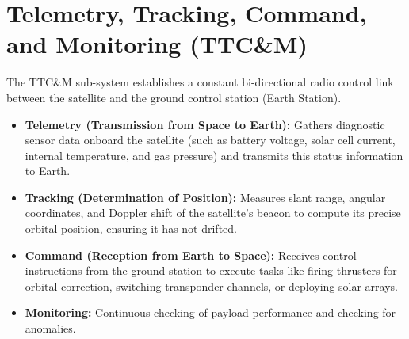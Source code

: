 \documentclass[12pt,a4paper]{article}
\begin{document}
\begin{tcolorbox}[tikzbox, title={Satellite Sub-systems Integration}]
\centering
{}
\end{tcolorbox}

\section{Telemetry, Tracking, Command, and Monitoring (TTC\&M)}

The TTC\&M sub-system establishes a constant bi-directional radio control link between the satellite and the ground control station (Earth Station).

\begin{itemize}[leftmargin=*, itemsep=3.5pt]
  \item \textbf{Telemetry (Transmission from Space to Earth):} Gathers diagnostic sensor data onboard the satellite (such as battery voltage, solar cell current, internal temperature, and gas pressure) and transmits this status information to Earth.
  \item \textbf{Tracking (Determination of Position):} Measures slant range, angular coordinates, and Doppler shift of the satellite's beacon to compute its precise orbital position, ensuring it has not drifted.
  \item \textbf{Command (Reception from Earth to Space):} Receives control instructions from the ground station to execute tasks like firing thrusters for orbital correction, switching transponder channels, or deploying solar arrays.
  \item \textbf{Monitoring:} Continuous checking of payload performance and checking for anomalies.
\end{itemize}
\end{document}
